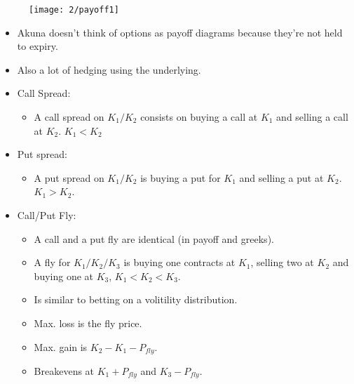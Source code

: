 \documentclass{article}
\begin{document}
\begin{figure}[h]
    \texttt{[image: 2/payoff1]}
    \centering
\end{figure}

\begin{itemize}
    \item Akuna doesn't think of options as payoff diagrams because they're not
    held to expiry.
    \item Also a lot of hedging using the underlying.
\end{itemize}

\begin{itemize}
    \item Call Spread:
    \begin{itemize}
        \item A call spread on $K_1 / K_2$ consists on buying a call at $K_1$
        and selling a call at $K_2$. $K_1 < K_2$
    \end{itemize}
    \item Put spread:
    \begin{itemize}
        \item A put spread on $K_1 / K_2$ is buying a put for $K_1$ and 
        selling a put at $K_2$. $K_1 > K_2$.
    \end{itemize}
    \item Call/Put Fly:
    \begin{itemize}
        \item A call and a put fly are identical (in payoff and greeks).
        \item A fly for $K_1/K_2/K_3$ is buying one contracts at $K_1$, selling
        two at $K_2$ and buying one at $K_3$, $K_1 < K_2 < K_3$.
        \item Is similar to betting on a volitility distribution.
        \item Max. loss is the fly price.
        \item Max. gain is $K_2 - K_1 - P_{fly}$.
        \item Breakevens at $K_1 + P_{fly}$ and $K_3 - P_{fly}$.
    \end{itemize}
\end{itemize}
\end{document}
